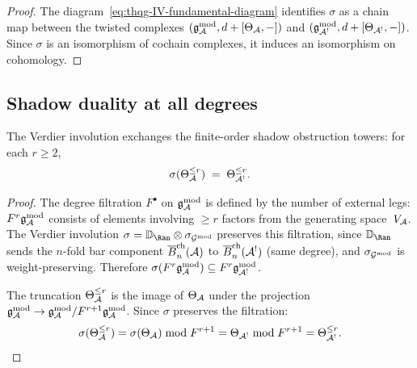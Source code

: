 \begin{proof}
The diagram~\eqref{eq:thqg-IV-fundamental-diagram} identifies
$\sigma$ as a chain map between the twisted complexes
$(\mathfrak{g}_{\mathcal{A}}^{\mathrm{mod}}, d + [\Theta_{\mathcal{A}}, -])$ and
$(\mathfrak{g}_{\mathcal{A}^!}^{\mathrm{mod}}, d + [\Theta_{\mathcal{A}^!}, -])$.
Since $\sigma$ is an isomorphism of cochain complexes, it induces an
isomorphism on cohomology.
\end{proof}

%
%

\subsection{Shadow duality at all degrees}
\label{subsec:thqg-IV-shadow-duality}

\begin{theorem}
\label{thm:thqg-IV-shadow-duality}
The Verdier involution exchanges the finite-order shadow obstruction towers:
for each $r \geq 2$,
\begin{equation}\label{eq:thqg-IV-shadow-duality}
\sigma(\Theta_{\mathcal{A}}^{\leq r}) \;=\; \Theta_{\mathcal{A}^!}^{\leq r}.
\end{equation}
\end{theorem}

\begin{proof}
The degree filtration $F^\bullet$ on $\mathfrak{g}_{\mathcal{A}}^{\mathrm{mod}}$ is defined by the
number of external legs: $F^r\mathfrak{g}_{\mathcal{A}}^{\mathrm{mod}}$ consists of elements involving
$\geq r$ factors from the generating space~$V_{\mathcal{A}}$.
The Verdier involution $\sigma = \VD_{\Ran} \otimes \sigma_{\Gmod}$
preserves this filtration, since $\VD_{\Ran}$ sends the $n$-fold
bar component $\overline{B}_n^{\mathrm{ch}}(\mathcal{A})$ to
$\overline{B}_n^{\mathrm{ch}}(\mathcal{A}^!)$ (same degree), and $\sigma_{\mathcal{G}^{\mathrm{mod}}}$
is weight-preserving. Therefore
$\sigma(F^r\mathfrak{g}_{\mathcal{A}}^{\mathrm{mod}}) \subseteq F^r \mathfrak{g}_{\mathcal{A}^!}^{\mathrm{mod}}$.

The truncation $\Theta_{\mathcal{A}}^{\leq r}$ is the image of $\Theta_{\mathcal{A}}$
under the projection $\mathfrak{g}_{\mathcal{A}}^{\mathrm{mod}} \to \mathfrak{g}_{\mathcal{A}}^{\mathrm{mod}} / F^{r+1}\mathfrak{g}_{\mathcal{A}}^{\mathrm{mod}}$.
Since $\sigma$ preserves the filtration:
\[
\sigma(\Theta_{\mathcal{A}}^{\leq r})
= \sigma(\Theta_{\mathcal{A}}) \bmod F^{r+1}
= \Theta_{\mathcal{A}^!} \bmod F^{r+1}
= \Theta_{\mathcal{A}^!}^{\leq r}.
\qedhere
\]
\end{proof}

